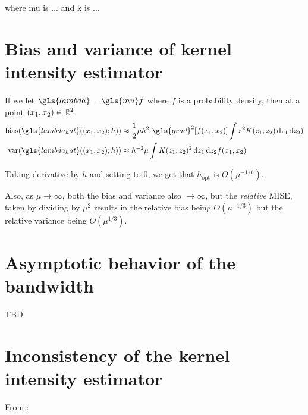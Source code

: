 where \gls{mu} is ... and \gls{k} is ...

\section{Bias and variance of kernel intensity estimator}
\label{sec:theory:bias_variance}

If we let \(\gls{lambda} = \gls{mu} f\) where \(f\) is a probability density, then at a point \((x_1, x_2) \in \mathbb{R}^2\),
\begin{align}
    \mbox{bias}(\gls{lambda_hat}((x_1, x_2);h)) & \approx
        \frac{1}{2} \mu h^2 ~ \gls{grad}^2\!\left[ f(x_1, x_2) \right]
            \int { z^2 K(z_1, z_2) \diff{z_1} \diff{z_2)} } \\
    \mbox{var}(\gls{lambda_hat}((x_1, x_2);h)) & \approx
        h^{-2} \mu
            \int { K(z_1, z_2)^2\diff{z_1} \diff{z_2} } f(x_1, x_2)
\end{align}

Taking derivative by \(h\) and setting to \(0\), we get that \(h_{\mbox{opt}}\) is \(O(\mu^{-1/6})\).

Also, as \(\mu \to \infty\), both the bias and variance also \(\to \infty\),
but the \textit{relative} MISE, taken by dividing by \(\mu^2\) results in the relative bias being \(O(\mu^{-1/3})\)
but the relative variance being \(O(\mu^{1/3})\).

\section{Asymptotic behavior of the bandwidth}
\label{sec:theory:bandwidth}

TBD

\section{Inconsistency of the kernel intensity estimator}
\label{sec:theory:inconsistency}

From \citet{guan2008consistent}:

